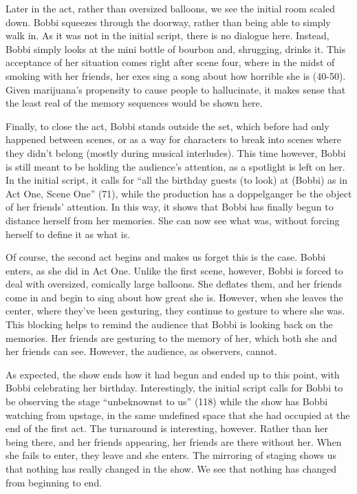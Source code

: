 \documentclass[12pt]{article}[titlepage]
\newcommand{\say}[1]{``#1''}
\newcommand{\1}{\={a}}
\newcommand{\2}{\={e}}
\newcommand{\3}{\={\i}}
\newcommand{\4}{\=o}
\newcommand{\5}{\=u}
\newcommand{\6}{\={A}}
\renewcommand{\,}{\textsuperscript{,}}
\begin{document}
Later in the act, rather than oversized balloons, we see the initial room scaled down.
Bobbi squeezes through the doorway, rather than being able to simply walk in.
As it was not in the initial script, there is no dialogue here.
Instead, Bobbi simply looks at the mini bottle of bourbon and, shrugging, drinks it.
This acceptance of her situation comes right after scene four, where in the midst of smoking with her friends, her exes sing a song about how horrible she is (40-50).
Given marijuana's propensity to cause people to hallucinate, it makes sense that the least real of the memory sequences would be shown here. 

Finally, to close the act, Bobbi stands outside the set, which before had only happened between scenes, or as a way for characters to break into scenes where they didn't belong (mostly during musical interludes).
This time however, Bobbi is still meant to be holding the audience's attention, as a spotlight is left on her.
In the initial script, it calls for \say{all the birthday guests (to look) at (Bobbi) as in Act One, Scene One} (71), while the production has a doppelganger be the object of her friends' attention.
In this way, it shows that Bobbi has finally begun to distance herself from her memories.
She can now see what was, without forcing herself to define it as what is.

Of course, the second act begins and makes us forget this is the case.
Bobbi enters, as she did in Act One.
Unlike the first scene, however, Bobbi is forced to deal with oversized, comically large balloons.
She deflates them, and her friends come in and begin to sing about how great she is.
However, when she leaves the center, where they've been gesturing, they continue to gesture to where she was.
This blocking helps to remind the audience that Bobbi is looking back on the memories.
Her friends are gesturing to the memory of her, which both she and her friends can see.
However, the audience, as observers, cannot.

As expected, the show ends how it had begun and ended up to this point, with Bobbi celebrating her birthday.
Interestingly, the initial script calls for Bobbi to be observing the stage \say{unbeknownst to us} (118) while the show has Bobbi watching from upstage, in the same undefined space that she had occupied at the end of the first act.
The turnaround is interesting, however.
Rather than her being there, and her friends appearing, her friends are there without her.
When she fails to enter, they leave and she enters.
The mirroring of staging shows us that nothing has really changed in the show.
We see that nothing has changed from beginning to end. 
\end{document}

